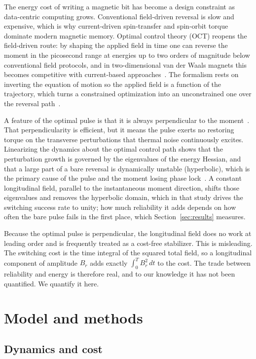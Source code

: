 \documentclass[11pt]{article}
\begin{document}
The energy cost of writing a magnetic bit has become a design constraint as data-centric computing
grows. Conventional field-driven reversal is slow and expensive, which is why current-driven
spin-transfer and spin-orbit torque dominate modern magnetic memory. Optimal control theory (OCT)
reopens the field-driven route: by shaping the applied field in time one can reverse the moment in the
picosecond range at energies up to two orders of magnitude below conventional field protocols, and in
two-dimensional van der Waals magnets this becomes competitive with current-based
approaches~\citep{badarneh2026}. The formalism rests on inverting the equation of motion so the applied
field is a function of the trajectory, which turns a constrained optimization into an unconstrained one
over the reversal path~\citep{kwiatkowski2021}.

A feature of the optimal pulse is that it is always perpendicular to the
moment~\citep{kwiatkowski2021}. That perpendicularity is efficient, but it means the pulse exerts no
restoring torque on the transverse perturbations that thermal noise continuously excites. Linearizing
the dynamics about the optimal control path shows that the perturbation growth is governed by the
eigenvalues of the energy Hessian, and that a large part of a bare reversal is dynamically unstable
(hyperbolic), which is the primary cause of the pulse and the moment losing phase
lock~\citep{badarneh2023stability}. A constant longitudinal field, parallel to the instantaneous moment
direction, shifts those eigenvalues and removes the hyperbolic domain, which in that study drives the
switching success rate to unity; how much reliability it adds depends on how often the bare pulse fails
in the first place, which Section~\ref{sec:results} measures.

Because the optimal pulse is perpendicular, the longitudinal field does no work at leading order and is
frequently treated as a cost-free stabilizer. This is misleading. The switching cost is the time
integral of the squared total field, so a longitudinal component of amplitude $B_r$ adds exactly
$\int_0^T B_r^2\,dt$ to the cost. The trade between reliability and energy is therefore real, and to
our knowledge it has not been quantified. We quantify it here.

\section{Model and methods}

\subsection{Dynamics and cost}
\end{document}
